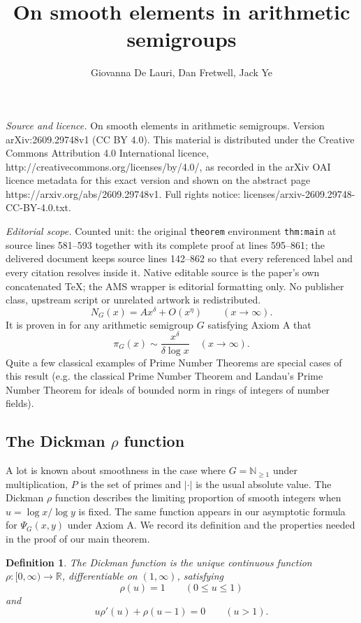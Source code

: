 \documentclass[10pt,a4paper]{amsart}
\newtheorem{definition}{Definition}[section]
\begin{document}
\title[On smooth elements in arithmetic semigroups]{On smooth elements in arithmetic semigroups}
\author{Giovanna De Lauri, Dan Fretwell, Jack Ye}
\date{}
\maketitle
\noindent\emph{Source and licence.} On smooth elements in arithmetic semigroups. Version arXiv:2609.29748v1 (CC BY 4.0). This material is distributed under the Creative Commons Attribution 4.0 International licence, http://creativecommons.org/licenses/by/4.0/, as recorded in the arXiv OAI licence metadata for this exact version and shown on the abstract page https://arxiv.org/abs/2609.29748v1. Full rights notice: licenses/arxiv-2609.29748-CC-BY-4.0.txt.\par\smallskip
\noindent\textit{Editorial scope.} Counted unit: the original \texttt{theorem} environment \texttt{thm:main} at source lines 581--593 together with its complete proof at lines 595--861; the delivered document keeps source lines 142--862 so that every referenced label and every citation resolves inside it. Native editable source is the paper's own concatenated TeX; the AMS wrapper is editorial formatting only. No publisher class, upstream script or unrelated artwork is redistributed.
        \begin{equation}\label{axiom}
        N_G(x) = Ax^{\delta} + O(x^{\eta})\qquad(x\to\infty).
        \end{equation}
        It is proven in \cite[Chapter VI]{knopfmacher2015abstract} for any arithmetic semigroup $G$ satisfying Axiom A that
        \begin{equation}\label{primecounting}
    \pi_G(x)\sim\frac{x^\delta}{\delta\log x}\quad(x\rightarrow\infty).
        \end{equation}
        Quite a few classical examples of Prime Number Theorems are special cases of this result (e.g. the classical Prime Number Theorem and Landau's Prime Number Theorem \cite{landau2010einfuhrung} for ideals of bounded norm in rings of integers of number fields).

\subsection{The Dickman \texorpdfstring{$\rho$}{rho} function}
A lot is known about smoothness in the case where $G = \mathbb{N}_{\geq 1}$ under multiplication, $P$ is the set of primes and $|\cdot|$ is the usual absolute value.
The Dickman $\rho$ function describes the limiting proportion of smooth integers when $u=\log x/\log y$ is fixed. The same function appears in our asymptotic formula for $\Psi_G(x,y)$ under Axiom A. We record its definition and the properties needed in the proof of our main theorem.
\begin{definition}\label{def:dickman}
The Dickman function is the unique continuous function
$\rho:[0,\infty)\to\mathbb R$, differentiable on
$(1,\infty)$, satisfying
\[
\rho(u)=1\qquad(0\le u\le1)
\]
and
\[
u\rho'(u)+\rho(u-1)=0\qquad(u>1).
\]
\end{definition}
\end{document}
